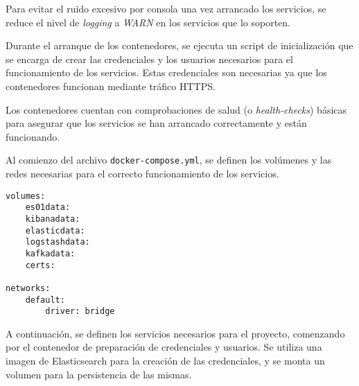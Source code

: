 Para evitar el ruido excesivo por consola una vez arrancado los servicios, se
reduce el nivel de \textit{logging} a \textit{WARN} en los servicios que lo
soporten.

Durante el arranque de los contenedores, se ejecuta un script de inicialización
que se encarga de crear las credenciales y los usuarios necesarios para el
funcionamiento de los servicios. Estas credenciales son necesarias ya que los
contenedores funcionan mediante tráfico HTTPS.

Los contenedores cuentan con comprobaciones de salud (o \textit{health-checks})
básicas para asegurar que los servicios se han arrancado correctamente y están
funcionando.

Al comienzo del archivo \texttt{docker-compose.yml}, se definen los volúmenes y
las redes necesarias para el correcto funcionamiento de los servicios.

\begin{lstlisting}[style=yaml, caption={Definición de volúmenes y redes en Docker Compose}]
volumes:
	es01data:
	kibanadata:
	elasticdata:
	logstashdata:
	kafkadata:
	certs:

networks:
	default:
		driver: bridge
\end{lstlisting}

A continuación, se definen los servicios necesarios para el proyecto, comenzando
por el contenedor de preparación de credenciales y usuarios. Se utiliza una
imagen de Elasticsearch para la creación de las credenciales, y se monta un
volumen para la persistencia de las mismas.

